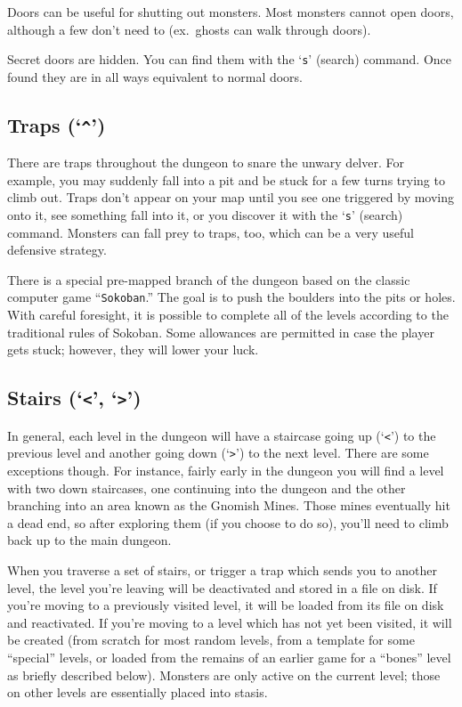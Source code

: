 Doors can be useful for shutting out monsters.  Most monsters cannot
open doors, although a few don't need to (ex.\ ghosts can walk through
doors).

Secret doors are hidden.  You can find them with the `{\tt s}' (search)
command.  Once found they are in all ways equivalent to normal doors.

\subsection*{Traps (`{\tt \^{}}')}

There are traps throughout the dungeon to snare the unwary delver.
For example, you may suddenly fall into a pit and be stuck for a few
turns trying to climb out.  Traps don't appear on your map until you
see one triggered by moving onto it, see something fall into it, or you
discover it with the `{\tt s}' (search) command.  Monsters can fall prey to
traps, too, which can be a very useful defensive strategy.

There is a special pre-mapped branch of the dungeon based on the
classic computer game ``{\tt Sokoban}.''  The goal is to push the boulders
into the pits or holes.  With careful foresight, it is possible to
complete all of the levels according to the traditional rules of
Sokoban.  Some allowances are permitted in case the player gets stuck;
however, they will lower your luck.

\subsection*{Stairs (`{\tt <}', `{\tt >}')}

In general, each level in the dungeon will have a staircase going up
(`{\tt <}') to the previous level and another going down (`{\tt >}')
to the next
level.  There are some exceptions though.  For instance, fairly early
in the dungeon you will find a level with two down staircases, one
continuing into the dungeon and the other branching into an area
known as the Gnomish Mines.  Those mines eventually hit a dead end,
so after exploring them (if you choose to do so), you'll need to
climb back up to the main dungeon.

When you traverse a set of stairs, or trigger a trap which sends you
to another level, the level you're leaving will be deactivated and
stored in a file on disk.  If you're moving to a previously visited
level, it will be loaded from its file on disk and reactivated.  If
you're moving to a level which has not yet been visited, it will be
created (from scratch for most random levels, from a template for
some ``special'' levels, or loaded from the remains of an earlier game
for a ``bones'' level as briefly described below).  Monsters are only
active on the current level; those on other levels are essentially
placed into stasis.
 
